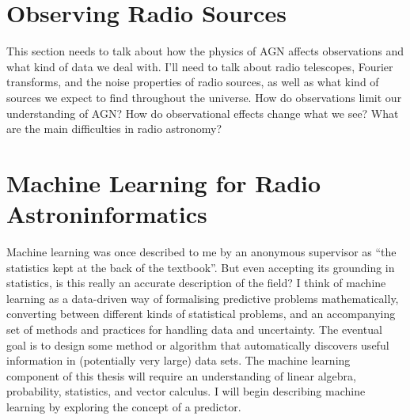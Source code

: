 \section{Observing Radio Sources}
\label{sec:radio-astronomy}

This section needs to talk about how the physics of AGN affects observations and what kind of data we deal with. I'll need to talk about radio telescopes, Fourier transforms, and the noise properties of radio sources, as well as what kind of sources we expect to find throughout the universe. How do observations limit our understanding of AGN? How do observational effects change what we see? What are the main difficulties in radio astronomy?


\section{Machine Learning for Radio Astroninformatics}
\label{sec:radio-astroinformatics}


    Machine learning was once described to me by an anonymous supervisor as ``the statistics kept at the back of the textbook''. But even accepting its grounding in statistics, is this really an accurate description of the field? I think of machine learning as a data-driven way of formalising predictive problems mathematically, converting between different kinds of statistical problems, and an accompanying set of methods and practices for handling data and uncertainty. The eventual goal is to design some method or algorithm that automatically discovers useful information in (potentially very large) data sets. The machine learning component of this thesis will require an understanding of linear algebra, probability, statistics, and vector calculus. I will begin describing machine learning by exploring the concept of a predictor.

